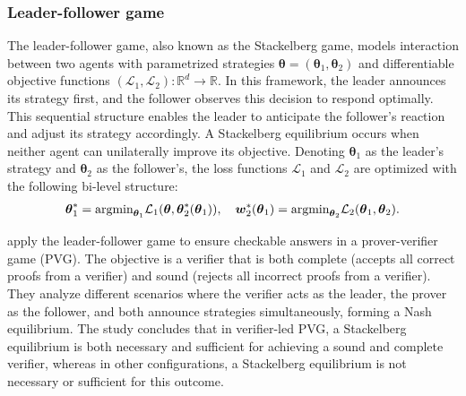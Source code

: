 \subsubsection{Leader-follower game} \label{lfg}
The leader-follower game, also known as the Stackelberg game, models interaction between two agents with parametrized strategies $\boldsymbol{\theta} = (\boldsymbol{\theta}_1, \boldsymbol{\theta}_2)$ and differentiable objective functions $(\mathcal{L}_1, \mathcal{L}_2): \mathbb{R}^d \rightarrow \mathbb{R}$. In this framework, the leader announces its strategy first, and the follower observes this decision to respond optimally. This sequential structure enables the leader to anticipate the follower’s reaction and adjust its strategy accordingly. A Stackelberg equilibrium occurs when neither agent can unilaterally improve its objective. Denoting $\boldsymbol{\theta}_1$ as the leader’s strategy and $\boldsymbol{\theta}_2$ as the follower’s, the loss functions $\mathcal{L}_1$ and $\mathcal{L}_2$ are optimized with the following bi-level structure:
\begin{align*}
    \boldsymbol{\theta}_1^* = \text{argmin}_{\boldsymbol{\theta}_1} \mathcal{L}_1(\boldsymbol{\theta}, \boldsymbol{\theta}_2^*(\boldsymbol{\theta}_1)), \quad \boldsymbol{w}_2^*(\boldsymbol{\theta}_1) = \text{argmin}_{\boldsymbol{\theta}_2} \mathcal{L}_2(\boldsymbol{\theta}_1, \boldsymbol{\theta}_2).
\end{align*}

\citet{DBLP:journals/corr/abs-2108-12099} apply the leader-follower game to ensure checkable answers in a prover-verifier game (PVG). The objective is a verifier that is both complete (accepts all correct proofs from a verifier) and sound (rejects all incorrect proofs from a verifier). They analyze different scenarios where the verifier acts as the leader, the prover as the follower, and both announce strategies simultaneously, forming a Nash equilibrium. The study concludes that in verifier-led PVG, a Stackelberg equilibrium is both necessary and sufficient for achieving a sound and complete verifier, whereas in other configurations, a Stackelberg equilibrium is not necessary or sufficient for this outcome.

